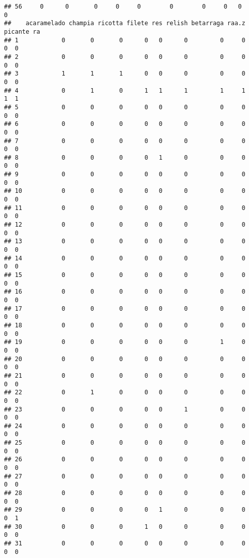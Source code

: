 \documentclass[
]{article}
\begin{document}
\begin{verbatim}
## 56     0      0       0     0     0        0        0     0   0         0
##    acaramelado champia ricotta filete res relish betarraga raa.z picante ra
## 1            0       0       0      0   0      0         0     0       0  0
## 2            0       0       0      0   0      0         0     0       0  0
## 3            1       1       1      0   0      0         0     0       0  0
## 4            0       1       0      1   1      1         1     1       1  1
## 5            0       0       0      0   0      0         0     0       0  0
## 6            0       0       0      0   0      0         0     0       0  0
## 7            0       0       0      0   0      0         0     0       0  0
## 8            0       0       0      0   1      0         0     0       0  0
## 9            0       0       0      0   0      0         0     0       0  0
## 10           0       0       0      0   0      0         0     0       0  0
## 11           0       0       0      0   0      0         0     0       0  0
## 12           0       0       0      0   0      0         0     0       0  0
## 13           0       0       0      0   0      0         0     0       0  0
## 14           0       0       0      0   0      0         0     0       0  0
## 15           0       0       0      0   0      0         0     0       0  0
## 16           0       0       0      0   0      0         0     0       0  0
## 17           0       0       0      0   0      0         0     0       0  0
## 18           0       0       0      0   0      0         0     0       0  0
## 19           0       0       0      0   0      0         1     0       0  0
## 20           0       0       0      0   0      0         0     0       0  0
## 21           0       0       0      0   0      0         0     0       0  0
## 22           0       1       0      0   0      0         0     0       0  0
## 23           0       0       0      0   0      1         0     0       0  0
## 24           0       0       0      0   0      0         0     0       0  0
## 25           0       0       0      0   0      0         0     0       0  0
## 26           0       0       0      0   0      0         0     0       0  0
## 27           0       0       0      0   0      0         0     0       0  0
## 28           0       0       0      0   0      0         0     0       0  0
## 29           0       0       0      0   1      0         0     0       0  1
## 30           0       0       0      1   0      0         0     0       0  0
## 31           0       0       0      0   0      0         0     0       0  0

\end{verbatim}
\end{document}

